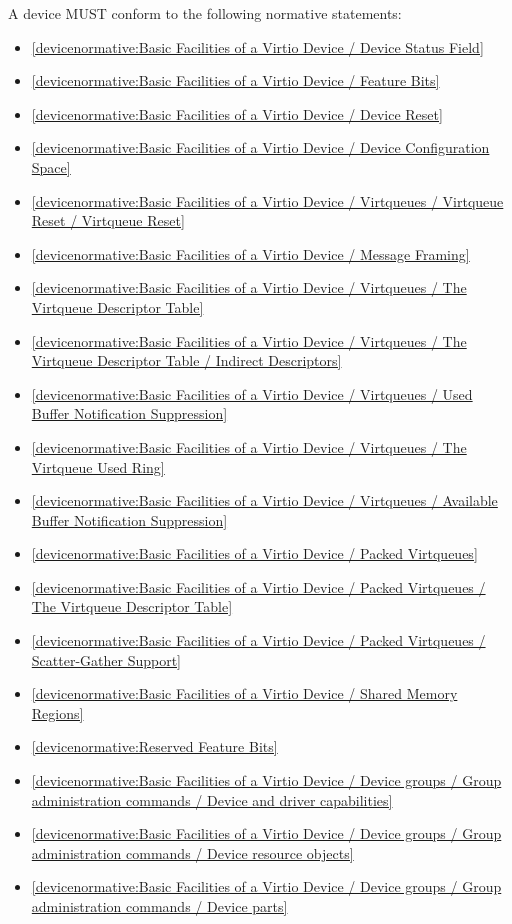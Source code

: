 \label{sec:Conformance / Device Conformance}

A device MUST conform to the following normative statements:

\begin{itemize}
\item \ref{devicenormative:Basic Facilities of a Virtio Device / Device Status Field}
\item \ref{devicenormative:Basic Facilities of a Virtio Device / Feature Bits}
\item \ref{devicenormative:Basic Facilities of a Virtio Device / Device Reset}
\item \ref{devicenormative:Basic Facilities of a Virtio Device / Device Configuration Space}
\item \ref{devicenormative:Basic Facilities of a Virtio Device / Virtqueues / Virtqueue Reset / Virtqueue Reset}
\item \ref{devicenormative:Basic Facilities of a Virtio Device / Message Framing}
\item \ref{devicenormative:Basic Facilities of a Virtio Device / Virtqueues / The Virtqueue Descriptor Table}
\item \ref{devicenormative:Basic Facilities of a Virtio Device / Virtqueues / The Virtqueue Descriptor Table / Indirect Descriptors}
\item \ref{devicenormative:Basic Facilities of a Virtio Device / Virtqueues / Used Buffer Notification Suppression}
\item \ref{devicenormative:Basic Facilities of a Virtio Device / Virtqueues / The Virtqueue Used Ring}
\item \ref{devicenormative:Basic Facilities of a Virtio Device / Virtqueues / Available Buffer Notification Suppression}
\item \ref{devicenormative:Basic Facilities of a Virtio Device / Packed Virtqueues}
\item \ref{devicenormative:Basic Facilities of a Virtio Device / Packed Virtqueues / The Virtqueue Descriptor Table}
\item \ref{devicenormative:Basic Facilities of a Virtio Device / Packed Virtqueues / Scatter-Gather Support}
\item \ref{devicenormative:Basic Facilities of a Virtio Device / Shared Memory Regions}
\item \ref{devicenormative:Reserved Feature Bits}
\item \ref{devicenormative:Basic Facilities of a Virtio Device / Device groups / Group administration commands / Device and driver capabilities}
\item \ref{devicenormative:Basic Facilities of a Virtio Device / Device groups / Group administration commands / Device resource objects}
\item \ref{devicenormative:Basic Facilities of a Virtio Device / Device groups / Group administration commands / Device parts}
\end{itemize}


